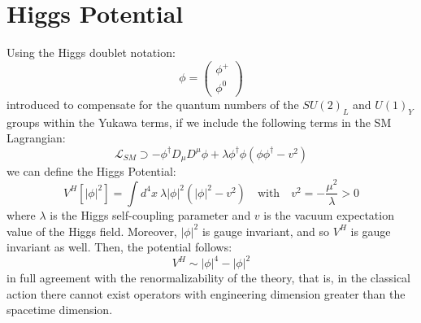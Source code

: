 \documentclass[11pt,a4paper,twoside,openright]{report}
\begin{document}
\section{Higgs Potential}
Using the Higgs doublet notation:
\begin{equation}
\phi = \begin{pmatrix} \phi^+ \\ \phi^0 \end{pmatrix}
\end{equation}
introduced to compensate for the quantum numbers of the \(SU(2)_L\) and \(U(1)_Y\) groups within the Yukawa terms, if we include the following terms in the SM Lagrangian:
\begin{equation}
\mathcal{L}_{SM} \supset -\phi^\dagger D_\mu D^\mu \phi +\lambda \phi^\dagger \phi(\phi\phi^\dagger-v^2)
\end{equation}
we can define the Higgs Potential:
\begin{equation}
V^H\left[ |\phi|^2\right] = \int d^4x\ \lambda|\phi|^2(|\phi|^2-v^2) \quad \text{with}\quad v^2=-\frac{\mu^2}{\lambda}>0
\end{equation}
where $\lambda$ is the Higgs self-coupling parameter and $v$ is the vacuum expectation value of the Higgs field. Moreover, $|\phi|^2$ is gauge invariant, and so $V^H$ is gauge invariant as well. Then, the potential follows:
\begin{equation}
V^H\sim|\phi|^4-|\phi|^2
\end{equation}
in full agreement with the renormalizability of the theory, that is, in the classical action there cannot exist operators with engineering dimension greater than the spacetime dimension.
\end{document}
